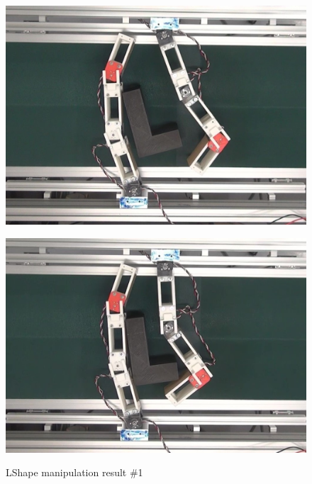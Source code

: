 \documentclass[a4paper,twoside,12pt,papersize, dvipdfmx]{iirthesis}
\begin{document}
\begin{figure}[hbt]
\begin{minipage}{0.249\hsize}
\includegraphics[width=0.98\hsize]{fig/4-manipulation-result/LShape/1-3.jpg}
\subcaption{}\label{}
\end{minipage}\hfill
\begin{minipage}{0.249\hsize}
\centering
\includegraphics[width=0.98\hsize]{fig/4-manipulation-result/LShape/1-4.jpg}
\subcaption{}\label{}
\end{minipage}
\caption{LShape manipulation result \#1}\label{fig::result::lm1}
\end{figure}
\end{document}
